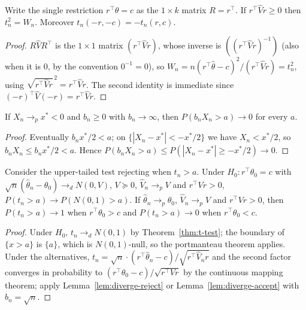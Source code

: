 \begin{lemma}[$t^2 = W$ for one restriction]
\label{lem:t-sq-wald}
\leanok
{}
Write the single restriction $r^\top\theta = c$ as the $1\times k$ matrix $R = r^\top$. If $r^\top\hat Vr\ge0$ then
$t_n^2 = W_n$. Moreover $t_n(-r,-c) = -t_n(r,c)$.
\end{lemma}
\begin{proof}
\leanok
$R\hat VR^\top$ is the $1\times1$ matrix $(r^\top\hat Vr)$, whose inverse is $((r^\top\hat Vr)^{-1})$ (also when it is $0$,
by the convention $0^{-1}=0$), so $W_n = n(r^\top\hat\theta-c)^2/(r^\top\hat Vr) = t_n^2$, using
$\sqrt{r^\top\hat Vr}^{\,2} = r^\top\hat Vr$. The second identity is immediate since $(-r)^\top\hat V(-r) = r^\top\hat Vr$.
\end{proof}

\begin{lemma}
\label{lem:diverge-accept}
\leanok
If $X_n\to_p x^* < 0$ and $b_n\ge0$ with $b_n\to\infty$, then $P(b_nX_n > a)\to0$ for every $a$.
\end{lemma}
\begin{proof}
\leanok
Eventually $b_nx^*/2 < a$; on $\{|X_n-x^*| < -x^*/2\}$ we have $X_n < x^*/2$, so $b_nX_n\le b_nx^*/2 < a$. Hence
$P(b_nX_n > a)\le P(|X_n-x^*|\ge -x^*/2)\to0$.
\end{proof}

\begin{theorem}
\label{thm:one-sided-t}
\leanok
{}
Consider the upper-tailed test rejecting when $t_n > a$. Under $H_0: r^\top\theta_0 = c$ with
$\sqrt n(\hat\theta_n-\theta_0)\to_d N(0,V)$, $V\succeq0$, $\hat V_n\to_pV$ and $r^\top Vr>0$,
$P(t_n > a)\to P(N(0,1) > a)$. If $\hat\theta_n\to_p\theta_0$, $\hat V_n\to_p V$ and $r^\top Vr > 0$, then
$P(t_n > a)\to1$ when $r^\top\theta_0 > c$ and $P(t_n > a)\to0$ when $r^\top\theta_0 < c$.
\end{theorem}
\begin{proof}
\leanok
Under $H_0$, $t_n\to_d N(0,1)$ by Theorem~\ref{thm:t-test}; the boundary of $\{x > a\}$ is $\{a\}$, which is
$N(0,1)$-null, so the portmanteau theorem applies. Under the alternatives,
$t_n = \sqrt n\cdot(r^\top\hat\theta_n-c)/\sqrt{r^\top\hat V_nr}$ and the second factor converges in probability to
$(r^\top\theta_0-c)/\sqrt{r^\top Vr}$ by the continuous mapping theorem; apply Lemma~\ref{lem:diverge-reject} or
Lemma~\ref{lem:diverge-accept} with $b_n = \sqrt n$.
\end{proof}

